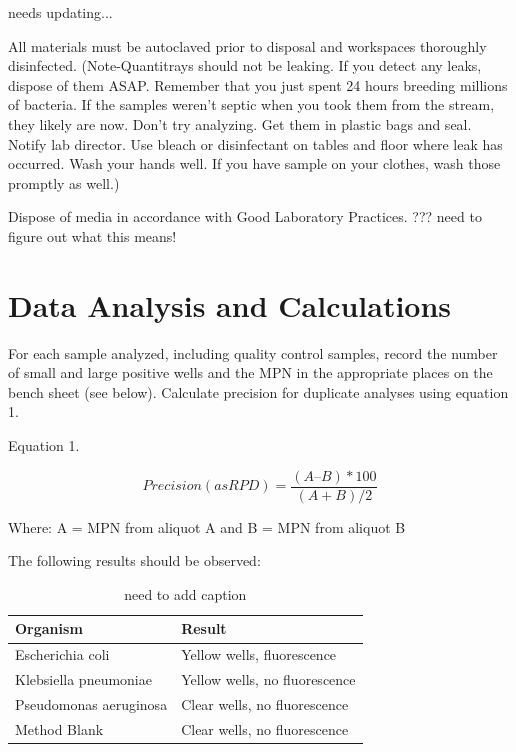 \documentclass[12pt]{../SOP4_alpha}\usepackage[]{graphicx}\usepackage[]{color}
\begin{document}
needs updating...

\NP All materials must be autoclaved prior to disposal and workspaces
thoroughly disinfected. (Note-Quantitrays should not be leaking. If you detect any leaks, dispose of them ASAP. Remember that you just spent 24 hours breeding millions of bacteria. If the samples weren't septic when you took them from the stream, they likely are now. Don't try analyzing. Get them in plastic bags and seal. Notify lab director. Use bleach or disinfectant on tables and floor where leak has occurred. Wash your hands well. If you have sample on your clothes, wash those promptly as well.)

\NP Dispose of media in accordance with Good Laboratory Practices. ??? need to figure out what this means! 

\section{Data Analysis and Calculations}

\NP For each sample analyzed, including quality control samples, record
the number of small and large positive wells and the MPN in the
appropriate places on the bench sheet (see below). Calculate
precision for duplicate analyses using equation 1.

\NP Equation 1. 

\begin{equation}
Precision (as RPD) = \frac{(A – B)*100}{(A + B)/2}
\end{equation}

Where: A = MPN from aliquot A and
 B = MPN from aliquot B 
 
 

\NP The following results should be observed:


\begin{table}
\caption{need to add caption}
		\begin{tabular}{ll}\hline

Organism                &  Result \\ \hline \hline
Escherichia coli        & Yellow wells, fluorescence \\
Klebsiella pneumoniae   & Yellow wells, no fluorescence \\
Pseudomonas aeruginosa  & Clear wells, no fluorescence \\
Method Blank            & Clear wells, no fluorescence \\ \hline
  \end{tabular}
\end{table}
\end{document}
